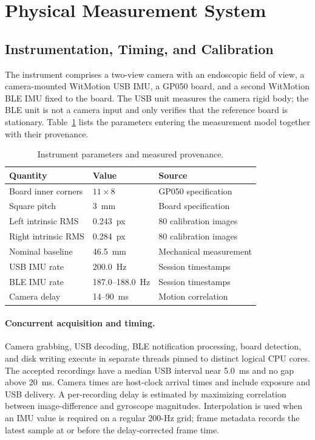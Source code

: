 \section{Physical Measurement System}
\label{sec:system}

\subsection{Instrumentation, Timing, and Calibration}
The instrument comprises a two-view camera with an endoscopic field of view,
a camera-mounted WitMotion USB IMU, a GP050 board, and a second WitMotion BLE
IMU fixed to the board. The USB unit measures the camera rigid body; the BLE
unit is not a camera input and only verifies that the reference board is
stationary. Table~\ref{tab:instrument} lists the parameters entering the
measurement model together with their provenance.

\begin{table}[t]
\centering
\caption{Instrument parameters and measured provenance.}
\label{tab:instrument}
\footnotesize
\setlength{\tabcolsep}{4pt}
\begin{tabular}{lll}
\toprule
Quantity & Value & Source \\
\midrule
Board inner corners & $11\times8$ & GP050 specification \\
Square pitch & 3~mm & Board specification \\
Left intrinsic RMS & 0.243~px & 80 calibration images \\
Right intrinsic RMS & 0.284~px & 80 calibration images \\
Nominal baseline & 46.5~mm & Mechanical measurement \\
USB IMU rate & 200.0~Hz & Session timestamps \\
BLE IMU rate & 187.0--188.0~Hz & Session timestamps \\
Camera delay & 14--90~ms & Motion correlation \\
\bottomrule
\end{tabular}
\end{table}

\paragraph{Concurrent acquisition and timing.}
Camera grabbing, USB decoding, BLE notification processing, board detection,
and disk writing execute in separate threads pinned to distinct logical CPU
cores. The accepted recordings have a median USB interval near 5.0~ms and no
gap above 20~ms. Camera times are host-clock arrival times and include
exposure and USB delivery. A per-recording delay is estimated by maximizing
correlation between image-difference and gyroscope magnitudes. Interpolation
is used when an IMU value is required on a regular 200-Hz grid; frame metadata
records the latest sample at or before the delay-corrected frame time.


